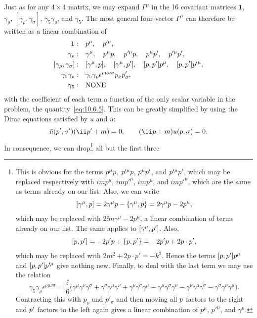 Just as for any $4\times4$ matrix, we may expand $\Gamma^\mu$ in the 16
covariant matrices $\mathbf{1}$, $\gamma_\rho$,
$[\gamma_\rho,\gamma_\sigma]$, $\gamma_5\gamma_\rho$, and $\gamma_5$. The most
general four-vector $\Gamma^\mu$ can therefore be written as a linear
combination of
\begin{align*}
  \mathbf{1}:\quad& p^\mu,\quad p'^\mu,
  \\
  \gamma_\rho:\quad& \gamma^\mu,\quad
    p^\mu\sl{p},\quad p'^\mu\sl{p},\quad
    p^\mu\sl{p}',\quad p'^\mu\sl{p}',
  \\
  [\gamma_\rho,\gamma_\sigma]:\quad&
    [\gamma^\mu,\sl{p}],\quad [\gamma^\mu,\sl{p}'],\quad
    [\sl{p},\sl{p}']p^\mu,\quad [\sl{p},\sl{p}']p'^\mu,
  \\
  \gamma_5\gamma_\rho:\quad&
    \gamma_5\gamma_\rho\epsilon^{\rho\mu\nu\sigma}p_\nu p'_\sigma,
  \\
  \gamma_5:\quad& \text{NONE}
\end{align*}
with the coefficient of each term a function of the only scalar variable in
the problem, the quantity~\eqref{eq:10.6.5}. This can be greatly simplified by
using the Dirac equations satisfied by $u$ and $\bar u$:
\begin{equation*}
  \bar u(p',\sigma')(\ii\sl{p}'+m)=0,
  \qquad
  (\ii\sl{p}+m)u(p,\sigma)=0.
\end{equation*}
In consequence, we can drop\footnote{This is obvious for the terms
$p^\mu\sl{p}$, $p'^\mu\sl{p}$, $p^\mu\sl{p}'$, and
$p'^\mu\sl{p}'$, which may be replaced respectively with $imp^\mu$,
$imp'^\mu$, $imp^\mu$, and $imp'^\mu$, which are the same as terms already
on our list. Also, we can write
\[
  [\gamma^\mu,\sl{p}]
  =2\gamma^\mu\sl{p}-\{\gamma^\mu,\sl{p}\}
  =2\gamma^\mu\sl{p}-2p^\mu,
\]
which may be replaced with $2\ii m\gamma^\mu-2p^\mu$, a linear combination of
terms already on our list. The same applies to
$[\gamma^\mu,\sl{p}']$. Also,
\[
  [\sl{p},\sl{p}']
  =-2\sl{p}'\sl{p}+\{\sl{p},\sl{p}'\}
  =-2\sl{p}'\sl{p}+2p\cdot p',
\]
which may be replaced with $2m^2+2p\cdot p'=-k^2$. Hence the terms
$[\sl{p},\sl{p}']p^\mu$ and $[\sl{p},\sl{p}']p'^\mu$ give nothing new.
Finally, to deal with the last term we may use the relation
\[
  \gamma_5\gamma_\rho\epsilon^{\rho\mu\nu\sigma}
  =\frac{\ii}{6}\bigl(
  \gamma^\mu\gamma^\nu\gamma^\sigma
  +\gamma^\sigma\gamma^\mu\gamma^\nu
  +\gamma^\nu\gamma^\sigma\gamma^\mu
  -\gamma^\mu\gamma^\sigma\gamma^\nu
  -\gamma^\nu\gamma^\mu\gamma^\sigma
  -\gamma^\sigma\gamma^\nu\gamma^\mu\bigr).
\]
Contracting this with $p_\nu$ and $p'_\sigma$ and then moving all $\sl{p}$
factors to the right and $\sl{p}'$ factors to the left again gives a linear
combination of $p^\mu$, $p'^\mu$, and $\gamma^\mu$.} all but the first three
